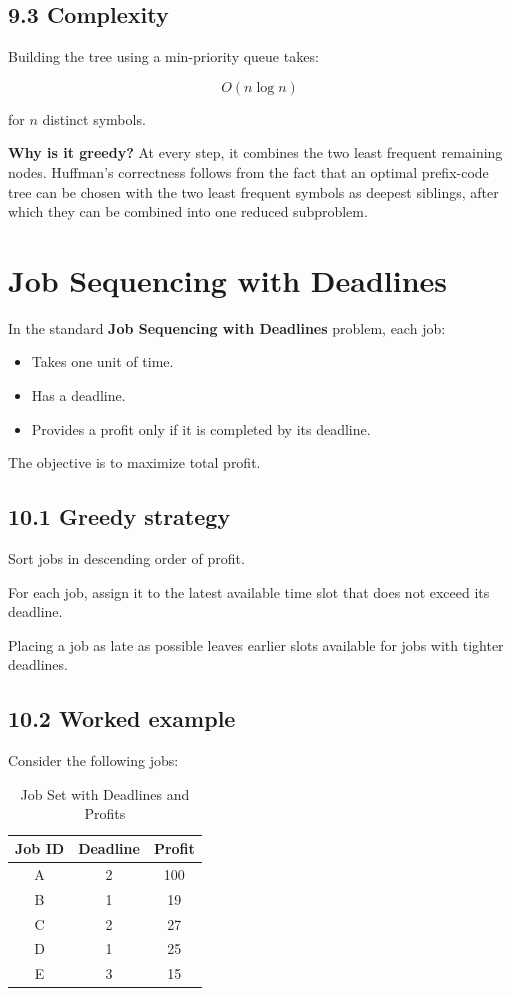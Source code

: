\subsection{9.3 Complexity}

Building the tree using a min-priority queue takes:


\[
\boxed{O(n\log n)}
\]


for $n$ distinct symbols.

\textbf{Why is it greedy?} At every step, it combines the two least frequent remaining nodes. Huffman's correctness follows from the fact that an optimal prefix-code tree can be chosen with the two least frequent symbols as deepest siblings, after which they can be combined into one reduced subproblem.

\section{Job Sequencing with Deadlines}

In the standard \textbf{Job Sequencing with Deadlines} problem, each job:

\begin{itemize}
    \item Takes one unit of time.
    \item Has a deadline.
    \item Provides a profit only if it is completed by its deadline.
\end{itemize}

The objective is to maximize total profit.

\subsection{10.1 Greedy strategy}

Sort jobs in descending order of profit.

For each job, assign it to the latest available time slot that does not exceed its deadline.

Placing a job as late as possible leaves earlier slots available for jobs with tighter deadlines.

\subsection{10.2 Worked example}

Consider the following jobs:

\begin{table}[htbp]
\centering
\caption{Job Set with Deadlines and Profits}
\label{tab:job_sequencing}
\begin{tabular}{ccc}
\toprule
\textbf{Job ID} & \textbf{Deadline} & \textbf{Profit} \\
\midrule
A & 2 & 100 \\
B & 1 & 19 \\
C & 2 & 27 \\
D & 1 & 25 \\
E & 3 & 15 \\
\bottomrule
\end{tabular}
\end{table}


